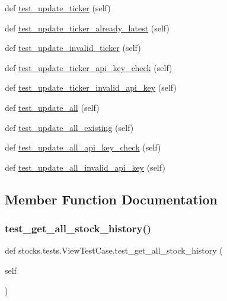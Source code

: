 \begin{DoxyCompactItemize}
def \mbox{\hyperlink{classstocks_1_1tests_1_1_view_test_case_a0583f6d1895e7a98e9156fb01ca785a2}{test\+\_\+update\+\_\+ticker}} (self)
\item 
def \mbox{\hyperlink{classstocks_1_1tests_1_1_view_test_case_a0794c69e03de1cf85ee490f0bf6be5e2}{test\+\_\+update\+\_\+ticker\+\_\+already\+\_\+latest}} (self)
\item 
def \mbox{\hyperlink{classstocks_1_1tests_1_1_view_test_case_a122a576c4be868f941a7d1fca2c5c188}{test\+\_\+update\+\_\+invalid\+\_\+ticker}} (self)
\item 
def \mbox{\hyperlink{classstocks_1_1tests_1_1_view_test_case_a61c3bdc301ef40c84704d8b2630d62bb}{test\+\_\+update\+\_\+ticker\+\_\+api\+\_\+key\+\_\+check}} (self)
\item 
def \mbox{\hyperlink{classstocks_1_1tests_1_1_view_test_case_ad0f6d1743dfa3ee2e681000b9246b892}{test\+\_\+update\+\_\+ticker\+\_\+invalid\+\_\+api\+\_\+key}} (self)
\item 
def \mbox{\hyperlink{classstocks_1_1tests_1_1_view_test_case_ab802f27159bdbc80348a17d2370e0f8a}{test\+\_\+update\+\_\+all}} (self)
\item 
def \mbox{\hyperlink{classstocks_1_1tests_1_1_view_test_case_adaa6a206656cb4a9c05f7376f6b15461}{test\+\_\+update\+\_\+all\+\_\+existing}} (self)
\item 
def \mbox{\hyperlink{classstocks_1_1tests_1_1_view_test_case_a3d75983e03c72099b81b70c4918998ab}{test\+\_\+update\+\_\+all\+\_\+api\+\_\+key\+\_\+check}} (self)
\item 
def \mbox{\hyperlink{classstocks_1_1tests_1_1_view_test_case_adc732cc51d49e4ab5503098f996ff78b}{test\+\_\+update\+\_\+all\+\_\+invalid\+\_\+api\+\_\+key}} (self)
\end{DoxyCompactItemize}


\subsection{Member Function Documentation}
\mbox{\label{classstocks_1_1tests_1_1_view_test_case_a86133da39156dbaa0091060ede0481aa}} 
\subsubsection{\texorpdfstring{test\+\_\+get\+\_\+all\+\_\+stock\+\_\+history()}{test\_get\_all\_stock\_history()}}
{\footnotesize\ttfamily def stocks.\+tests.\+View\+Test\+Case.\+test\+\_\+get\+\_\+all\+\_\+stock\+\_\+history (\begin{DoxyParamCaption}\item[{}]{self }\end{DoxyParamCaption})}

